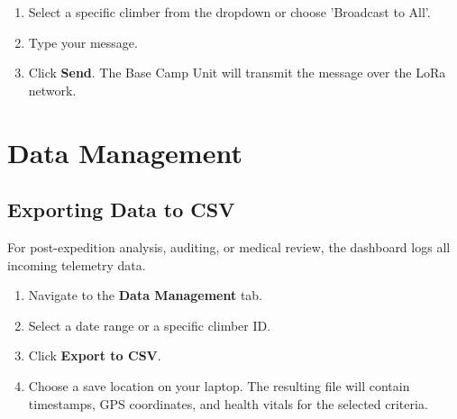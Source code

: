 \begin{enumerate}
    \item Select a specific climber from the dropdown or choose 'Broadcast to All'.
    \item Type your message.
    \item Click \textbf{Send}. The Base Camp Unit will transmit the message over the LoRa network.
\end{enumerate}

\section{Data Management}

\subsection{Exporting Data to CSV}
For post-expedition analysis, auditing, or medical review, the dashboard logs all incoming telemetry data.

\begin{enumerate}
    \item Navigate to the \textbf{Data Management} tab.
    \item Select a date range or a specific climber ID.
    \item Click \textbf{Export to CSV}.
    \item Choose a save location on your laptop. The resulting file will contain timestamps, GPS coordinates, and health vitals for the selected criteria.
\end{enumerate}
